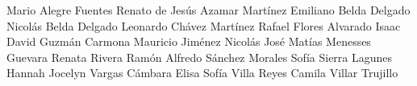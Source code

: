 Mario Alegre Fuentes
Renato de Jesús Azamar Martínez
Emiliano Belda Delgado
Nicolás Belda Delgado
Leonardo Chávez Martínez
Rafael Flores Alvarado
Isaac David Guzmán Carmona
Mauricio Jiménez Nicolás
José Matías Menesses Guevara
Renata Rivera Ramón
Alfredo Sánchez Morales
Sofía Sierra Lagunes
Hannah Jocelyn Vargas Cámbara
Elisa Sofía Villa Reyes
Camila Villar Trujillo
